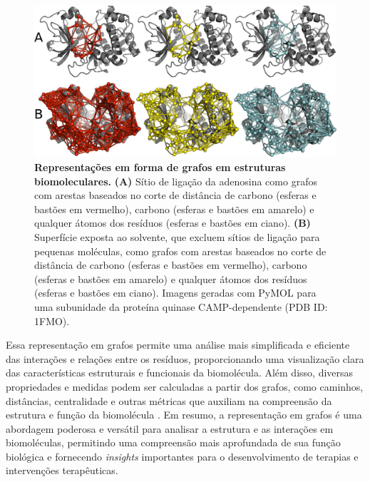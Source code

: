 \documentclass[Portugues]{phdquali}
\begin{document}

\begin{figure}[ht]
  \centerline{\includegraphics[scale=1.9]{images/graph-representation.png}}
  \caption[Representações em forma de grafos em estruturas biomoleculares]{\textbf{Representações em forma de grafos em estruturas biomoleculares.} \textbf{(A)} Sítio de ligação da adenosina como grafos com arestas baseados no corte de distância de carbono \textalpha\space (esferas e bastões em vermelho), carbono \textbeta\space (esferas e bastões em amarelo) e qualquer átomos dos resíduos (esferas e bastões em ciano). \textbf{(B)} Superfície exposta ao solvente, que excluem sítios de ligação para pequenas moléculas, como grafos com arestas baseados no corte de distância de carbono \textalpha\space (esferas e bastões em vermelho), carbono \textbeta\space (esferas e bastões em amarelo) e qualquer átomos dos resíduos (esferas e bastões em ciano). Imagens geradas com PyMOL para uma subunidade da proteína quinase CAMP-dependente (PDB ID: 1FMO).}
  \label{fig:graph-representation}
\end{figure}

Essa representação em grafos permite uma análise mais simplificada e eficiente das interações e relações entre os resíduos, proporcionando uma visualização clara das características estruturais e funcionais da biomolécula. Além disso, diversas propriedades e medidas podem ser calculadas a partir dos grafos, como caminhos, distâncias, centralidade e outras métricas que auxiliam na compreensão da estrutura e função da biomolécula \cite{majeed2020,vishveshwara2002,mason2007}. Em resumo, a representação em grafos é uma abordagem poderosa e versátil para analisar a estrutura e as interações em biomoléculas, permitindo uma compreensão mais aprofundada de sua função biológica e fornecendo \textit{insights} importantes para o desenvolvimento de terapias e intervenções terapêuticas.
\end{document}
